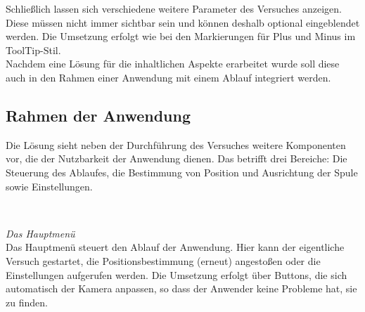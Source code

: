 Schließlich lassen sich verschiedene weitere Parameter des Versuches anzeigen. Diese müssen nicht immer sichtbar sein und können deshalb optional eingeblendet werden. Die Umsetzung erfolgt wie bei den Markierungen für Plus und Minus im ToolTip-Stil.\\

Nachdem eine Lösung für die inhaltlichen Aspekte erarbeitet wurde soll diese auch in den Rahmen einer Anwendung mit einem Ablauf integriert werden.

\subsection{Rahmen der Anwendung}
Die Lösung sieht neben der Durchführung des Versuches weitere Komponenten vor, die der Nutzbarkeit der Anwendung dienen. Das betrifft drei Bereiche: Die Steuerung des Ablaufes, die Bestimmung von Position und Ausrichtung der Spule sowie Einstellungen.

\vspace{8px}
\begin{center}
	\\
\end{center}
\vspace{6px}

\textit{Das Hauptmenü}\\
Das Hauptmenü steuert den Ablauf der Anwendung. Hier kann der eigentliche Versuch gestartet, die Positionsbestimmung (erneut) angestoßen oder die Einstellungen aufgerufen werden. Die Umsetzung erfolgt über Buttons, die sich automatisch der Kamera anpassen, so dass der Anwender keine Probleme hat, sie zu finden.\\

